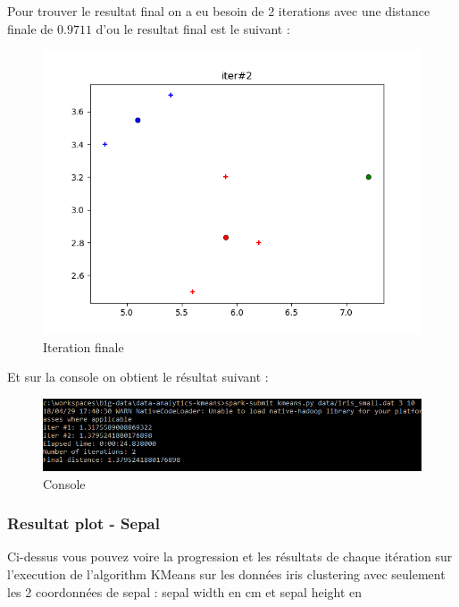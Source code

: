 \documentclass[french]{article}
\begin{document}
Pour trouver le resultat final on a eu besoin de 2 iterations avec une distance finale de $0.9711$ d'ou le resultat final est le suivant :
\begin{figure}[h!]
\centering
\includegraphics[width=\linewidth]{img/result-kmeans-final.png}
\caption{Iteration finale}
\end{figure}
\newpage 
Et sur la console on obtient le résultat suivant :
\begin{figure}[h!]
\centering
\includegraphics[width=\linewidth]{img/example.png}
\caption{Console}
\end{figure}

\newpage
\subsubsection{Resultat plot - Sepal}
Ci-dessus vous pouvez voire la progression et les résultats de chaque itération sur l'execution de l'algorithm KMeans sur les données iris clustering avec seulement les 2 coordonnées de sepal : sepal width en cm et sepal height en 
\end{document}
